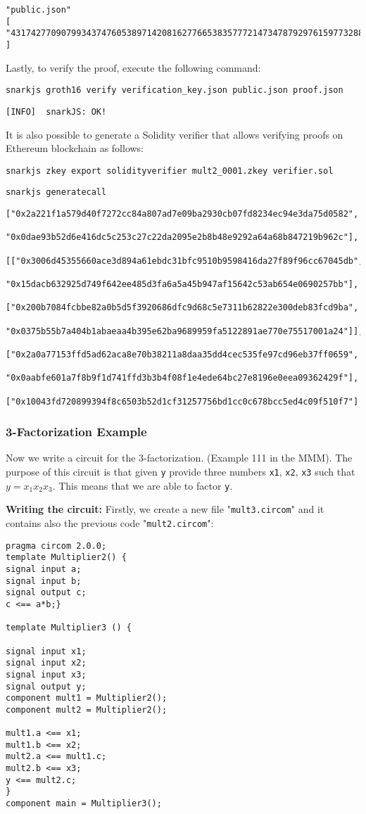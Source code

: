 \documentclass[a4paper,oneside,12pt]{book}
\begin{document}
\begin{verbatim}
"public.json"
[
"4317427709079934374760538971420816277665383577721473478792976159773288300544"
]
\end{verbatim}
\noindent Lastly, to verify the proof, execute the following command:

\verb|snarkjs groth16 verify verification_key.json public.json proof.json|

\verb|[INFO]  snarkJS: OK!|

\noindent It is also possible to generate a Solidity verifier that allows verifying proofs on Ethereum blockchain as follows:

\verb|snarkjs zkey export solidityverifier mult2_0001.zkey verifier.sol|

\verb|snarkjs generatecall|

\begin{verbatim}
["0x2a221f1a579d40f7272cc84a807ad7e09ba2930cb07fd8234ec94e3da75d0582",
 "0x0dae93b52d6e416dc5c253c27c22da2095e2b8b48e9292a64a68b847219b962c"],
 [["0x3006d45355660ace3d894a61ebdc31bfc9510b9598416da27f89f96cc67045db",
 "0x15dacb632925d749f642ee485d3fa6a5a45b947af15642c53ab654e0690257bb"],
 ["0x200b7084fcbbe82a0b5d5f3920686dfc9d68c5e7311b62822e300deb83fcd9ba",
  "0x0375b55b7a404b1abaeaa4b395e62ba9689959fa5122891ae770e75517001a24"]],
 ["0x2a0a77153ffd5ad62aca8e70b38211a8daa35dd4cec535fe97cd96eb37ff0659",
  "0x0aabfe601a7f8b9f1d741ffd3b3b4f08f1e4ede64bc27e8196e0eea09362429f"],
 ["0x10043fd720899394f8c6503b52d1cf31257756bd1cc0c678bcc5ed4c09f510f7"]
\end{verbatim}

\subsubsection{3-Factorization Example}
\noindent Now we write a circuit for the 3-factorization. (Example 111 in the MMM). The purpose of this circuit is that given \verb|y| provide three numbers \verb|x1|, \verb|x2|, \verb|x3| such that $y = x_1x_2x_3$. This means that we are able to factor \verb|y|.  

\noindent \textbf{Writing the circuit:} Firstly, we create a new file "\verb|mult3.circom|" and it contains also the previous code "\verb|mult2.circom|":

\begin{verbatim}
pragma circom 2.0.0;
template Multiplier2() {
signal input a;
signal input b;
signal output c;
c <== a*b;}

template Multiplier3 () {

signal input x1;
signal input x2;
signal input x3;
signal output y;
component mult1 = Multiplier2();
component mult2 = Multiplier2();

mult1.a <== x1;
mult1.b <== x2;
mult2.a <== mult1.c;
mult2.b <== x3;
y <== mult2.c;
}
component main = Multiplier3();
\end{verbatim}
\end{document}
